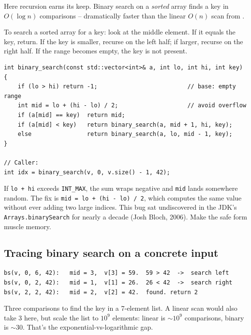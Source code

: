 \documentclass[11pt]{article}
\begin{document}
Here recursion earns its keep. Binary search on a \emph{sorted} array
finds a key in $O(\log n)$ comparisons -- dramatically faster than the
linear $O(n)$ scan from .

\begin{defnbox}
To search a sorted array for a key: look at the middle element. If it
equals the key, return. If the key is smaller, recurse on the left
half; if larger, recurse on the right half. If the range becomes
empty, the key is not present.
\end{defnbox}

\begin{examplebox}
\begin{verbatim}
int binary_search(const std::vector<int>& a, int lo, int hi, int key) {
    if (lo > hi) return -1;                          // base: empty range
    int mid = lo + (hi - lo) / 2;                    // avoid overflow
    if (a[mid] == key)  return mid;
    if (a[mid] < key)   return binary_search(a, mid + 1, hi, key);
    else                return binary_search(a, lo, mid - 1, key);
}

// Caller:
int idx = binary_search(v, 0, v.size() - 1, 42);
\end{verbatim}
\end{examplebox}

\begin{warnbox}[\texttt{mid = (lo + hi) / 2} is an overflow bug]
If \texttt{lo + hi} exceeds \texttt{INT\_MAX}, the sum wraps negative
and \texttt{mid} lands somewhere random. The fix is
\texttt{mid = lo + (hi - lo) / 2}, which computes the same value
without ever adding two large indices. This bug sat undiscovered in
the JDK's \texttt{Arrays.binarySearch} for nearly a decade (Josh
Bloch, 2006). Make the safe form muscle memory.
\end{warnbox}

\subsection{Tracing binary search on a concrete input}

\begin{examplebox}
\begin{verbatim}
bs(v, 0, 6, 42):   mid = 3,  v[3] = 59.  59 > 42  ->  search left
bs(v, 0, 2, 42):   mid = 1,  v[1] = 26.  26 < 42  ->  search right
bs(v, 2, 2, 42):   mid = 2,  v[2] = 42.  found. return 2
\end{verbatim}
Three comparisons to find the key in a 7-element list. A linear scan
would also take 3 here, but scale the list to $10^9$ elements: linear
is $\sim 10^9$ comparisons, binary is $\sim 30$. That's the
exponential-vs-logarithmic gap.
\end{examplebox}
\end{document}
